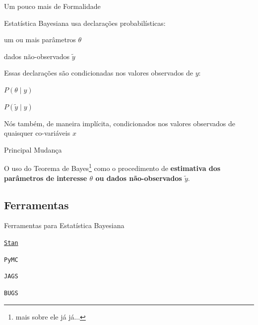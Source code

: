 \begin{frame}{Um pouco mais de Formalidade}
    \begin{vfilleditems}
        \item Estatística Bayesiana usa declarações probabilísticas: 
        \begin{vfilleditems}
            \item um ou mais parâmetros $\theta$
            \item dados não-observados $\tilde{y}$
        \end{vfilleditems}
        \item Essas declarações são condicionadas nos valores observados de $y$:
        \begin{vfilleditems}
            \item $P(\theta \mid y)$
            \item $P(\tilde{y} \mid y)$
        \end{vfilleditems}
        \item Nós também, de maneira implícita, condicionados nos valores observados de quaisquer co-variáveis $x$
    \end{vfilleditems}
\end{frame}

\begin{frame}{Principal Mudança}
    \begin{defn}
        O uso do Teorema de Bayes\footnote{mais sobre ele já já...} como o procedimento de \textbf{estimativa dos parâmetros de interesse $\theta$ ou dados não-observados $\tilde{y}$}. \citep{gelman2013bayesian}
    \end{defn}
\end{frame}

\subsection{Ferramentas}

\begin{frame}{Ferramentas para Estatística Bayesiana}
    \begin{vfilleditems}
        \item \LARGE  \href{https://mc-stan.org}{\texttt{Stan}}
        \item \texttt{PyMC}
        \item \small \texttt{JAGS}
        \item \footnotesize \texttt{BUGS}
    \end{vfilleditems}
\end{frame}

